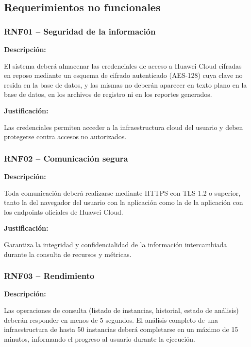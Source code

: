 \subsection{Requerimientos no funcionales}

\subsubsection{RNF01 -- Seguridad de la información}

\noindent \textbf{Descripción:}

El sistema deberá almacenar las credenciales de acceso a Huawei Cloud cifradas en reposo mediante un esquema de cifrado autenticado (AES-128) cuya clave no resida en la base de datos, y las mismas no deberán aparecer en texto plano en la base de datos, en los archivos de registro ni en los reportes generados.

\noindent \textbf{Justificación:}

Las credenciales permiten acceder a la infraestructura cloud del usuario y deben protegerse contra accesos no autorizados.

\subsubsection{RNF02 -- Comunicación segura}

\noindent \textbf{Descripción:}

Toda comunicación deberá realizarse mediante HTTPS con TLS 1.2 o superior, tanto la del navegador del usuario con la aplicación como la de la aplicación con los endpoints oficiales de Huawei Cloud.

\noindent \textbf{Justificación:}

Garantiza la integridad y confidencialidad de la información intercambiada durante la consulta de recursos y métricas.

\subsubsection{RNF03 -- Rendimiento}

\noindent \textbf{Descripción:}

Las operaciones de consulta (listado de instancias, historial, estado de análisis) deberán responder en menos de 5 segundos. El análisis completo de una infraestructura de hasta 50 instancias deberá completarse en un máximo de 15 minutos, informando el progreso al usuario durante la ejecución.

